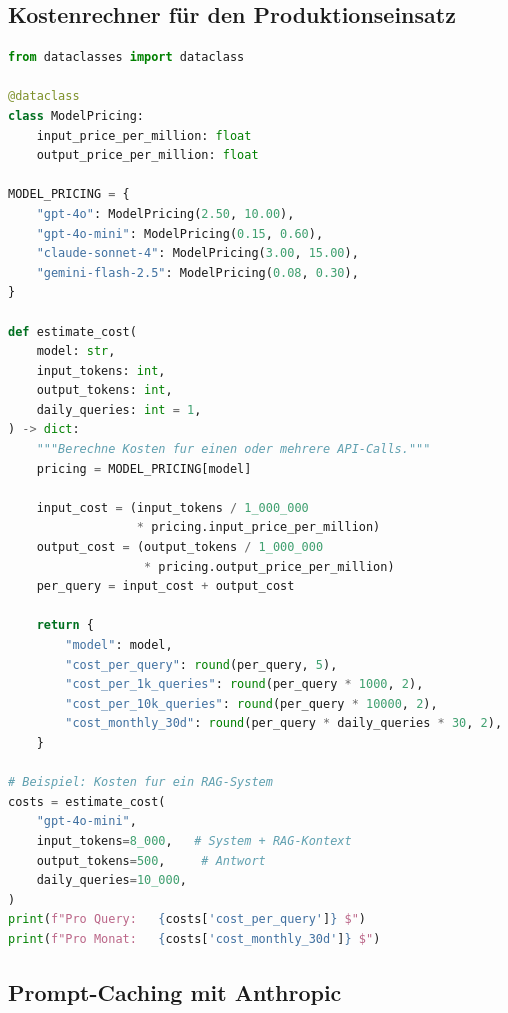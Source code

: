 \subsection{Kostenrechner für den Produktionseinsatz}

\begin{lstlisting}[language=Python, caption={Kostenrechner für LLM-API-Calls}, label=lst:cost-calculator]
from dataclasses import dataclass

@dataclass
class ModelPricing:
    input_price_per_million: float
    output_price_per_million: float

MODEL_PRICING = {
    "gpt-4o": ModelPricing(2.50, 10.00),
    "gpt-4o-mini": ModelPricing(0.15, 0.60),
    "claude-sonnet-4": ModelPricing(3.00, 15.00),
    "gemini-flash-2.5": ModelPricing(0.08, 0.30),
}

def estimate_cost(
    model: str,
    input_tokens: int,
    output_tokens: int,
    daily_queries: int = 1,
) -> dict:
    """Berechne Kosten fur einen oder mehrere API-Calls."""
    pricing = MODEL_PRICING[model]

    input_cost = (input_tokens / 1_000_000
                  * pricing.input_price_per_million)
    output_cost = (output_tokens / 1_000_000
                   * pricing.output_price_per_million)
    per_query = input_cost + output_cost

    return {
        "model": model,
        "cost_per_query": round(per_query, 5),
        "cost_per_1k_queries": round(per_query * 1000, 2),
        "cost_per_10k_queries": round(per_query * 10000, 2),
        "cost_monthly_30d": round(per_query * daily_queries * 30, 2),
    }

# Beispiel: Kosten fur ein RAG-System
costs = estimate_cost(
    "gpt-4o-mini",
    input_tokens=8_000,   # System + RAG-Kontext
    output_tokens=500,     # Antwort
    daily_queries=10_000,
)
print(f"Pro Query:   {costs['cost_per_query']} $")
print(f"Pro Monat:   {costs['cost_monthly_30d']} $")
\end{lstlisting}

\subsection{Prompt-Caching mit Anthropic}

